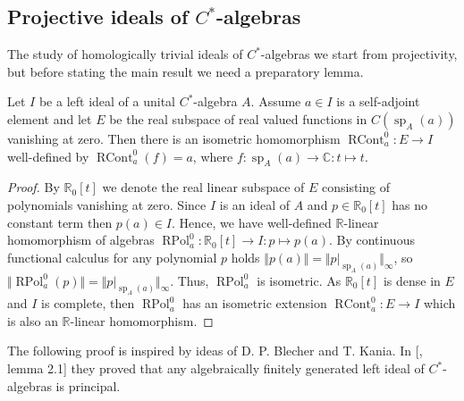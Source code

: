 
\subsection{
    Projective ideals of \texorpdfstring{$C^*$}{C*}-algebras}\label{
SubSectionProjectiveIdealsOfCStarAlgebras}

The study of homologically trivial ideals of $C^*$-algebras we start from
projectivity, but before stating the main result we need a preparatory lemma.

\begin{lemma}\label{ContFuncCalcOnIdealOfCStarAlg} Let $I$ be a left ideal of a
unital $C^*$-algebra $A$. Assume $a\in I$ is a self-adjoint element and let $E$
be the real subspace of real valued functions in $C(\operatorname{sp}_A(a))$
vanishing at zero. Then there is an isometric homomorphism
$\operatorname{RCont}_a^0:E\to I$ well-defined by
$\operatorname{RCont}_a^0(f)=a$, where
$f:\operatorname{sp}_A(a)\to\mathbb{C}:t\mapsto t$.
\end{lemma}
\begin{proof} By $\mathbb{R}_0[t]$ we denote the real linear subspace of $E$
consisting of polynomials vanishing at zero. Since $I$ is an ideal of $A$ and
$p\in\mathbb{R}_0[t]$ has no constant term then $p(a)\in I$.  Hence, we have
well-defined $\mathbb{R}$-linear homomorphism of algebras
$\operatorname{RPol}_a^0:\mathbb{R}_0[t]\to I:p\mapsto p(a)$. By continuous
functional calculus for any polynomial $p$ 
holds $\Vert p(a)\Vert=\Vert p|_{\operatorname{sp}_A(a)}\Vert_\infty$, so
$\Vert\operatorname{RPol}_a^0(p)\Vert
=\Vert p|_{\operatorname{sp}_A(a)}\Vert_\infty$. 
Thus, $\operatorname{RPol}_a^0$ is isometric. 
As $\mathbb{R}_0[t]$ is dense in $E$ and $I$ is complete, then
$\operatorname{RPol}_a^0$ has an isometric extension
$\operatorname{RCont}_a^0:E\to I$ which is also an $\mathbb{R}$-linear
homomorphism. 
\end{proof}

The following proof is inspired by ideas of D. P. Blecher and T. Kania. In
[\cite{BleKanFinGenCStarAlgHilbMod}, lemma 2.1] they proved that any
algebraically finitely generated left ideal of $C^*$-algebras is principal.  

